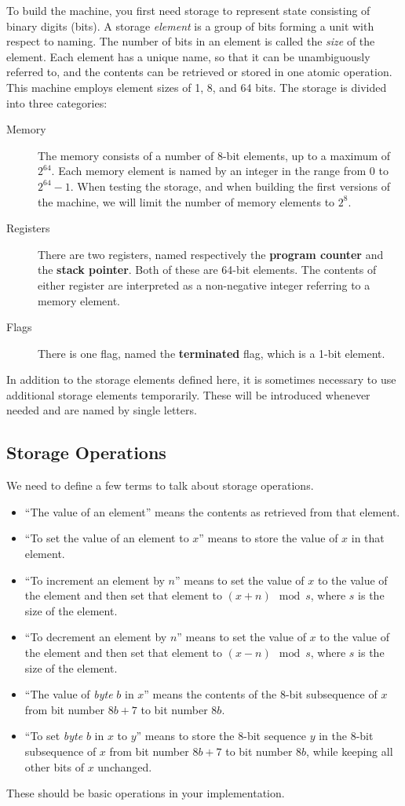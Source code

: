 \documentclass[a4paper,12pt]{article}
\newcommand{\PC}{\textbf{program counter}\xspace}
\newcommand{\SP}{\textbf{stack pointer}\xspace}
\newcommand{\TERM}{\textbf{terminated}\xspace}
\begin{document}
To build the machine, you first need storage to represent state consisting of binary digits (bits).
A storage \emph{element} is a group of bits forming a unit with respect to naming.
The number of bits in an element is called the \emph{size} of the element.
Each element has a unique name, so that it can be unambiguously referred to, and the contents can be retrieved or stored in one atomic operation.
This machine employs element sizes of 1, 8, and 64 bits.
The storage is divided into three categories:
\begin{description}
\item[Memory] 
The memory consists of a number of 8-bit elements, up to a maximum of $2^{64}$.
Each memory element is named by an integer in the range from $0$ to $2^{64} - 1$.
When testing the storage, and when building the first versions of the machine, we will limit the number of memory elements to $2^8$.
\item[Registers] 
There are two registers, named respectively the \PC and the \SP.
Both of these are 64-bit elements.
The contents of either register are interpreted as a non-negative integer referring to a memory element.
\item[Flags] 
There is one flag, named the \TERM flag, which is a 1-bit element.
\end{description}
In addition to the storage elements defined here, it is sometimes necessary to use additional storage elements temporarily.
These will be introduced whenever needed and are named by single letters.

\subsection{Storage Operations}
\label{sec:storage-operations}

We need to define a few terms to talk about storage operations.
\begin{itemize}
\item ``The value of an element'' means the contents as retrieved from that element.
\item ``To set the value of an element to $x$'' means to store the value of $x$ in that element.
\item ``To increment an element by $n$'' means to set the value of $x$ to the value of the element and then set that element to $(x + n) \mod s$, where $s$ is the size of the element.
\item ``To decrement an element by $n$'' means to set the value of $x$ to the value of the element and then set that element to $(x - n) \mod s$, where $s$ is the size of the element.
\item ``The value of \emph{byte} $b$ in $x$'' means the contents of the 8-bit subsequence of $x$ from bit number $8b+7$ to bit number $8b$.
\item ``To set \emph{byte} $b$ in $x$ to $y$'' means to store the 8-bit sequence $y$ in the 8-bit subsequence of $x$ from bit number $8b+7$ to bit number $8b$, while keeping all other bits of $x$ unchanged.
\end{itemize}
These should be basic operations in your implementation.
\end{document}

